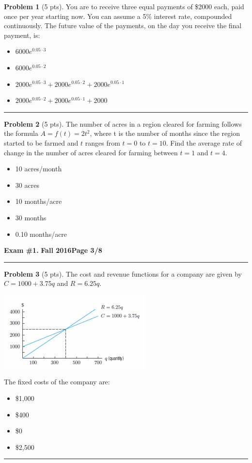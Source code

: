 \documentclass[12pt]{article}
\makeatletter
\theoremstyle{definition}
\newtheorem{problem}{Problem}
\newcommand*{\radiobutton}{%
  \@ifstar{\@radiobutton0}{\@radiobutton1}%
}
\newcommand*{\@radiobutton}[1]{%
  \begin{tikzpicture}
    \pgfmathsetlengthmacro\radius{height("X")/2}
    \draw[radius=\radius] circle;
    \ifcase#1 \fill[radius=.6*\radius] circle;\fi
  \end{tikzpicture}%
}
\makeatother
\begin{document}
\begin{problem}[5 pts]
You are to receive three equal payments of \$2000 each, paid once per year starting now. You can assume a 5\% interest rate, compounded continuously. The future value of the payments, on the day you receive the final payment, is:
\begin{itemize}
\item[\radiobutton] $6000 e^{0.05 \cdot 3}$
\item[\radiobutton] $6000 e^{0.05 \cdot 2}$
\item[\radiobutton] $2000 e^{0.05 \cdot 3} + 2000 e^{0.05 \cdot 2} + 2000 e^{0.05 \cdot 1}$
\item[\radiobutton] $2000 e^{0.05 \cdot 2} + 2000 e^{0.05 \cdot 1} + 2000$
\end{itemize}
\end{problem}
\hrule

\begin{problem}[5 pts]
The number of acres in a region cleared for farming follows the formula $A = f (t) = 2t^2$, where t is the number of months since the region started to be farmed and $t$ ranges from $t = 0$ to $t = 10$. Find the average rate of change in the number of acres cleared for farming between $t = 1$ and $t = 4$. 
\begin{itemize}
\item[\radiobutton] 10 acres/month
\item[\radiobutton] 30 acres
\item[\radiobutton] 10 months/acre
\item[\radiobutton] 30 months
\item[\radiobutton] 0.10 months/acre
\end{itemize}
\end{problem}

\newpage

\hfill{\large\bf Exam \#1.}\hfill{\large\bf
  Fall 2016}\hfill{\large\bf Page 3/8}\hrule

\bigskip
\begin{problem}[5 pts]
The cost and revenue functions for a company are given by $C = 1000 + 3.75q$ and $R = 6.25q$.
\begin{center}
\includegraphics{1graph1.png}
\end{center}
The fixed costs of the company are:
\begin{itemize}
\item[\radiobutton] \$1,000 
\item[\radiobutton] \$400
\item[\radiobutton] \$0
\item[\radiobutton] \$2,500
\end{itemize}
\end{problem}
\hrule
\end{document}
